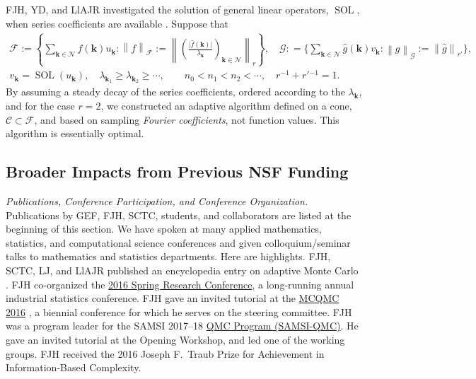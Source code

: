 \documentclass[11pt]{NSFamsart}
\newcommand{\QMC}{\hyperlink{QMClink}{QMC}\xspace}
\newcommand{\hf}{\widehat{f}}
\newcommand{\hg}{\widehat{g}}
\DeclareMathOperator{\SOL}{SOL}
\newcommand{\bk}{{\boldsymbol{k}}}
\newcommand{\cc}{\mathcal{C}}
\newcommand{\calf}{{\mathcal{F}}}
\newcommand{\calg}{{\mathcal{G}}}
\newcommand{\caln}{{\mathcal{N}}}
\newcommand{\bigabs}[1]{\ensuremath{\bigl \lvert #1 \bigr \rvert}}
\newcommand{\norm}[2][{}]{\ensuremath{\left \lVert #2 \right \rVert}_{#1}}
\newcommand{\bignorm}[2][{}]{\ensuremath{\bigl \lVert #2 \bigr \rVert}_{#1}}
\begin{document}
FJH, YD, and LlAJR investigated the solution of general linear operators, $\SOL$, when series coefficients are available \cite{DinHic20a}.  Suppose that 
\begin{subequations} \label{serForm}
\begin{gather}
    \calf := \left \{ \sum_{\bk \in \caln} \hf(\bk) u_{\bk} : \norm[\calf]{f} := \norm[r]{\left(\frac{\bigabs{\hf(\bk)}}{\lambda_{\bk}} \right)_{\bk \in \caln}} \right \},  \quad
    \calg : = \biggl \{ \sum_{\bk \in \caln} \hg(\bk) v_{\bk} : \norm[\calg]{g} := \bignorm[r']{\hg}\biggr \}, \\ 
    v_{\bk} = \SOL(u_{\bk}), \quad
     \lambda_{\bk_1} \ge \lambda_{\bk_2} \ge \cdots, \qquad
      n_0 < n_1 < n_2 < \cdots, \quad r^{-1} + r'{}^{-1} = 1.
\end{gather}

\end{subequations}
By assuming a steady decay of the series coefficients, ordered according to the $\lambda_{\bk}$, and for the case $r=2$, we constructed an adaptive algorithm defined on a cone, $\cc \subset \calf$, and based on sampling \emph{Fourier coefficients}, not function values.  This algorithm is essentially optimal.


\subsection{Broader Impacts from Previous NSF Funding} \label{prevBIsect}

\emph{Publications, Conference Participation, and Conference Organization.} Publications by GEF, FJH,  SCTC, students, and collaborators are listed at the beginning of this section.  We have spoken at many applied mathematics, statistics, 
and computational science conferences and given colloquium/seminar talks to mathematics and 
statistics departments.  Here are highlights.  FJH, SCTC, LJ, and LlAJR published  an 
encyclopedia entry on adaptive Monte Carlo \cite{HicEtal18a}.  FJH co-organized the 
\href{http://cos.iit.edu/2016-spring-research-conference/}{2016 Spring Research 
Conference}, a long-running annual industrial statistics conference.   FJH gave an invited tutorial 
at the \href{http://mcqmc2016.stanford.edu}{MCQMC 2016} 
\cite{Hic17a}, a biennial conference for which he serves on the steering committee.  FJH 
was a program leader for the SAMSI 2017--18 
\href{https://www.samsi.info/programs-and-activities/year-long-research-programs/2017-18-program-quasi-monte-carlo-high-dimensional-sampling-methods-applied-mathematics-qmc/
}{\QMC Program (\hypertarget{SAMSIlink}{SAMSI-QMC})}.   He  gave an invited tutorial 
	at the Opening Workshop, and led one of 
	the working groups.  FJH received the 2016 Joseph F.\ Traub 
	Prize for Achievement in Information-Based Complexity.
	
\end{document}
